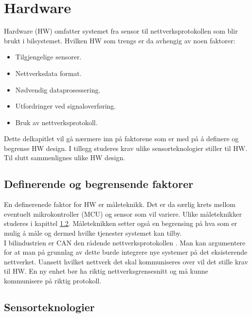 \section{Hardware}

Hardware (HW) omfatter systemet fra sensor til nettverksprotokollen som blir brukt i
bilsystemet. Hvilken HW
som trengs er da avhengig av noen faktorer:
\begin{itemize}
\item Tilgjengelige sensorer.
\item Nettverksdata format.
\item Nødvendig dataprosessering.
\item Utfordringer ved signaloverføring.
\item Bruk av nettverksprotokoll.
\end{itemize}

Dette delkapitlet vil gå nærmere inn på faktorene som er med på å definere og begrense HW design. I tillegg
studeres krav ulike sensorteknologier stiller til HW. Til slutt sammenlignes ulike HW design.


\subsection{Definerende og begrensende faktorer}

En definerenede faktor for HW er måleteknikk. Det er da særlig krets
mellom eventuelt mikrokontroller (MCU) og sensor som vil variere. Ulike måleteknikker studeres
i kapittel \ref{subsec:sensorteknologier}. Måleteknikken setter også en begrensing på hva som er
mulig å måle og dermed hvilke tjenester systemet kan tilby. \\

I bilindustrien er CAN den rådende nettverksprotokollen \cite{canbus}. Man
kan argumentere for at man på grunnlag av dette burde integrere nye systemer på
det eksisterende nettverket. Uansett hvilket nettverk det skal kommuniseres over
vil det stille krav til HW. En ny enhet bør ha riktig nettverksgrensesnitt
og må kunne kommunisere på riktig protokoll. 

\subsection{Sensorteknologier}
\label{subsec:sensorteknologier}

